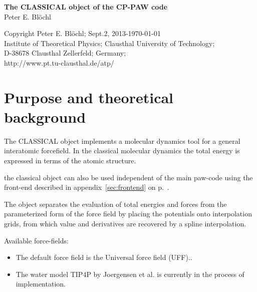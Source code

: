 \documentclass[11pt,a4paper]{report}
\begin{document}
\begin{titlepage}
\begin{center}
\vspace*{3.5cm}
{\huge \textbf{The CLASSICAL object of the CP-PAW code}}\\
\vspace{0.5cm}
{\large Peter E. Bl\"ochl}
\vspace{0.5cm} 
\end{center}

\vfill
\begin{center}
Copyright Peter E. Bl\"ochl; Sept.2, 2013-\today\\
{\small
Institute of Theoretical Physics;
Clausthal University of Technology;\\ 
D-38678 Clausthal Zellerfeld; Germany;\\
http://www.pt.tu-clausthal.de/atp/}
\end{center}
\end{titlepage}
\noindent            
\tableofcontents
\chapter{Purpose and theoretical background}
The CLASSICAL object implements a molecular dynamics tool for a
general interatomic forcefield. In the classical molecular dynamics the
total energy is expressed in terms of the atomic structure. 

the classical object can also be used independent of the main paw-code
using the front-end described in appendix~\ref{sec:frontend} on
p.~\pageref{sec:frontend}.

The object separates the evaluation of total energies and forces from
the parameterized form of the force field by placing the potentials
onto interpolation grids, from which value and derivatives are
recovered by a spline interpolation.

Available force-fields:
\begin{itemize}
\item The default force field is the Universal force field
(UFF).\cite{rappe92_jacs114_10024}. 
%
\item The water model TIP4P by Joergensen et al.\cite{jorgensen83_jcp79_926}
is currently in the process of implementation.
\end{itemize}

\end{document}
